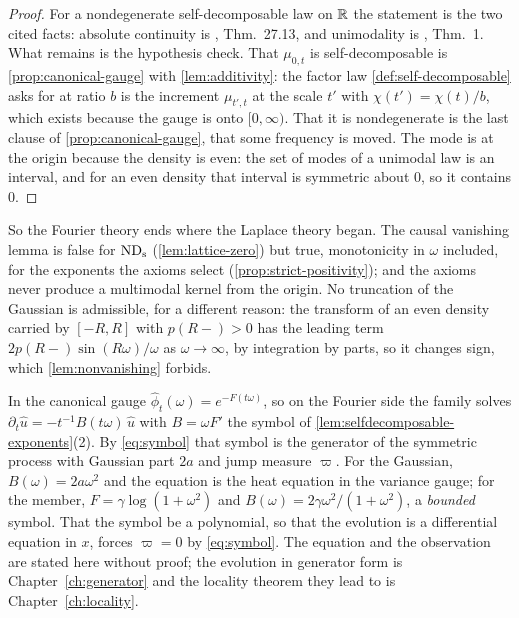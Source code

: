 \begin{proof}
\leanok
For a nondegenerate self-decomposable law on $\mathbb{R}$ the statement is the two cited facts:
absolute continuity is , Thm.~27.13, and unimodality is
, Thm.~1. What remains is the hypothesis check. That
$\mu_{0,t}$ is self-decomposable is \ref{prop:canonical-gauge} with \ref{lem:additivity}: the
factor law \ref{def:self-decomposable} asks for at ratio $b$ is the increment $\mu_{t',t}$ at
the scale $t'$ with $\chi(t') = \chi(t)/b$, which exists because the gauge is onto
$[0,\infty)$. That it is nondegenerate is the last clause of \ref{prop:canonical-gauge}, that
some frequency is moved. The mode is at the origin because the density is even: the set of
modes of a unimodal law is an interval, and for an even density that interval is symmetric
about $0$, so it contains $0$.
\end{proof}

So the Fourier theory ends where the Laplace theory began. The causal vanishing lemma is false
for $\mathrm{ND}_{\mathrm{s}}$ (\ref{lem:lattice-zero}) but true, monotonicity in $\omega$ included, for the
exponents the axioms select (\ref{prop:strict-positivity}); and the axioms never produce a
multimodal kernel from the origin. No truncation of the Gaussian is admissible, for a
different reason: the transform of an even density carried by $[-R,R]$ with $p(R-) > 0$ has
the leading term $2p(R-)\sin(R\omega)/\omega$ as $\omega \to \infty$, by integration by parts,
so it changes sign, which \ref{lem:nonvanishing} forbids.

\begin{remark}\label{rem:scale-evolution-preview}
In the canonical gauge $\hat\phi_t(\omega) = e^{-F(t\omega)}$, so on the Fourier side the
family solves $\partial_t\hat u = -t^{-1}B(t\omega)\,\hat u$ with $B = \omega F'$ the symbol of
\ref{lem:selfdecomposable-exponents}(2). By \ref{eq:symbol} that symbol is the generator of the
symmetric \Levy{} process with Gaussian part $2a$ and jump measure $\varpi$. For the Gaussian,
$B(\omega) = 2a\omega^2$ and the equation is the heat equation in the variance gauge; for the
\Matern{} member, $F = \gamma\log(1+\omega^2)$ and $B(\omega) = 2\gamma\omega^2/(1+\omega^2)$, a
\emph{bounded} symbol. That the
symbol be a polynomial, so that the evolution is a differential equation in $x$, forces
$\varpi = 0$ by \ref{eq:symbol}. The equation and the observation are stated here without
proof; the evolution in generator form is Chapter~\ref{ch:generator} and the locality theorem
they lead to is Chapter~\ref{ch:locality}.
\end{remark}
